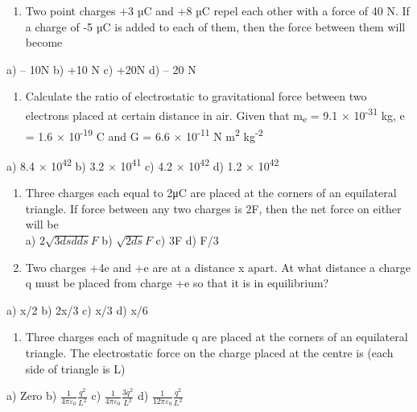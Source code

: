 \begin{enumerate}
\def\labelenumi{\arabic{enumi}.}
\setcounter{enumi}{10}
\item
  Two point charges +3 µC and +8 µC repel each other with a force of 40
  N. If a charge of -5 µC is added to each of them, then the force
  between them will become
\end{enumerate}

a) -- 10N b) +10 N c) +20N d) -- 20 N

\begin{enumerate}
\def\labelenumi{\arabic{enumi}.}
\setcounter{enumi}{11}
\item
  Calculate the ratio of electrostatic to gravitational force between
  two electrons placed at certain distance in air. Given that
  m\textsubscript{e} = 9.1 × 10\textsuperscript{-31} kg, e = 1.6 ×
  10\textsuperscript{-19} C and G = 6.6 × 10\textsuperscript{-11} N
  m\textsuperscript{2} kg\textsuperscript{-2}
\end{enumerate}

a) 8.4 × 10\textsuperscript{42} b) 3.2 × 10\textsuperscript{41} c) 4.2 ×
10\textsuperscript{42} d) 1.2 × 10\textsuperscript{42}

\begin{enumerate}
\def\labelenumi{\arabic{enumi}.}
\setcounter{enumi}{12}
\item
  Three charges each equal to 2μC are placed at the corners of an
  equilateral triangle. If force between any two charges is 2F, then the
  net force on either will be\\
  a) \(2\sqrt{3dsdds}F\) b) \(\sqrt{2ds}F\) c) 3F d) F/3
\item
  Two charges +4e and +e are at a distance x apart. At what distance a
  charge q must be placed from charge +e so that it is in equilibrium?
\end{enumerate}

a) x/2 b) 2x/3 c) x/3 d) x/6

\begin{enumerate}
\def\labelenumi{\arabic{enumi}.}
\setcounter{enumi}{14}
\item
  Three charges each of magnitude q are placed at the corners of an
  equilateral triangle. The electrostatic force on the charge placed at
  the centre is (each side of triangle is L)
\end{enumerate}

a) Zero b) \(\frac{1}{4\pi\varepsilon_{0}}\frac{q^{2}}{L^{2}}\) c)
\(\frac{1}{4\pi\varepsilon_{0}}\frac{3q^{2}}{L^{2}}\) d)
\(\frac{1}{12\pi\varepsilon_{0}}\frac{q^{2}}{L^{2}}\)

